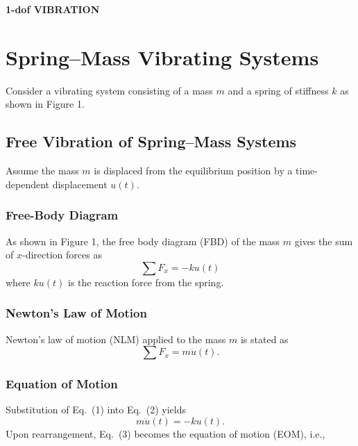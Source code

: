 \setcounter{section}{0}
{\centering\LARGE\bfseries 1-dof VIBRATION\par}

\section{Spring--Mass Vibrating Systems}
Consider a vibrating system consisting of a mass $m$ and a spring of stiffness $k$ as shown in Figure 1.

\setcounter{figure}{0}

\subsection{Free Vibration of Spring--Mass Systems}
Assume the mass $m$ is displaced from the equilibrium position by a time-dependent displacement $u(t)$.

\subsubsection{Free-Body Diagram}
As shown in Figure 1, the free body diagram (FBD) of the mass $m$ gives the sum of $x$-direction forces as
\begin{equation}
    \sum F_x=-k u(t)
    \tag{1}
\end{equation}
where $k u(t)$ is the reaction force from the spring.

\subsubsection{Newton's Law of Motion}
Newton's law of motion (NLM) applied to the mass $m$ is stated as
\begin{equation}
    \sum F_x=m\ddot{u}(t).
    \tag{2}
\end{equation}

\subsubsection{Equation of Motion}
Substitution of Eq.~(1) into Eq.~(2) yields
\begin{equation}
    m\ddot{u}(t)=-k u(t).
    \tag{3}
\end{equation}
Upon rearrangement, Eq.~(3) becomes the equation of motion (EOM), i.e.,
